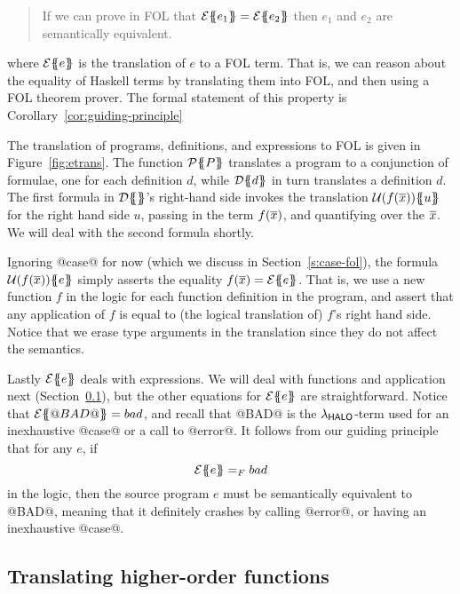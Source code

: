 \begin{quote}
If we can prove in FOL that $\etrans{}{}{e_1} = \etrans{}{}{e_2}$ then
$e_1$ and $e_2$ are semantically equivalent.
\end{quote}

where $\etrans{}{}{e}$ is the translation of $e$ to a FOL term. That is, we can
reason about the equality of Haskell terms by translating them into FOL, and then using
a FOL theorem prover. The formal statement of this property is Corollary~\ref{cor:guiding-principle}
 

The translation of programs, definitions, and expressions to FOL
is given in Figure~\ref{fig:etrans}.
The function $\ptrans{}{P}$ translates a program to a conjunction of formulae,
one for each definition $d$, while $\dtrans{}{d}$ in turn translates
a definition $d$.
The first formula in $\dtrans{}{}$'s right-hand side invokes the translation
$\utrans{}{u}{f(\ol{x})}$ for the right hand side $u$, passing in the term $f(\ol{x})$,
and quantifying over the $\ol{x}$.  We will deal with the second formula shortly.


Ignoring @case@ for now (which we discuss in Section~\ref{s:case-fol}),
the formula $\utrans{}{e}{f(\ol{x})}$
simply asserts the equality $f(\ol{x}) = \etrans{}{}{e}$.
That is, we use a new function $f$ in the logic for each function definition in the
program, and assert that any application of $f$ is equal to (the logical translation of)
$f$'s right hand side. Notice that we erase type arguments in the translation
since they do not affect the semantics.

Lastly $\etrans{}{}{e}$ deals with expressions.  We will deal with
functions and application next
(Section~\ref{s:hof}), but the other equations for $\etrans{}{}{e}$
are straightforward.  Notice that $\etrans{}{}{@BAD@} = bad$, and recall
that @BAD@ is the $\theLang$-term used for an inexhaustive @case@ or a call
to @error@.  It follows from our guiding principle
that for any $e$, if
$$ \etrans{}{}{e} =_F bad $$
in the logic, then the source program $e$
must be semantically equivalent to @BAD@, meaning that it definitely
crashes by calling @error@, or having an inexhaustive @case@.


\subsection{Translating higher-order functions} \label{s:hof}

